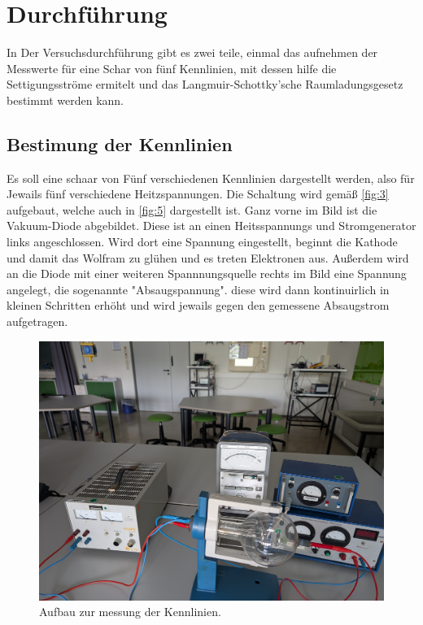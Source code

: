 \section{Durchführung}
\label{sec:Durchführung}
In Der Versuchsdurchführung gibt es zwei teile, einmal das aufnehmen der Messwerte für eine Schar von fünf Kennlinien, 
mit dessen hilfe die Settigungsströme ermitelt und das Langmuir-Schottky’sche Raumladungsgesetz bestimmt werden kann.
\subsection{Bestimung der Kennlinien}
\label{sec:1}
Es soll eine schaar von Fünf verschiedenen Kennlinien dargestellt werden, also für Jewails fünf verschiedene 
Heitzspannungen. Die Schaltung wird gemäß \autoref{fig:3} aufgebaut, welche auch in \autoref{fig:5} dargestellt ist.
Ganz vorne im Bild ist die Vakuum-Diode abgebildet. Diese ist an einen Heitsspannungs und Stromgenerator links angeschlossen.
Wird dort eine Spannung eingestellt, beginnt die Kathode und damit das Wolfram zu glühen und es treten Elektronen aus.
 Außerdem wird 
an die Diode mit einer weiteren Spannnungsquelle rechts im Bild eine Spannung angelegt, die sogenannte "Absaugspannung". diese wird 
dann kontinuirlich in kleinen Schritten erhöht und wird jewails gegen den gemessene Absaugstrom aufgetragen.
\begin{figure}[H]
    \centering
        \centering
        \includegraphics[width=\textwidth]{Bilder/2.jpg}
        \caption{Aufbau zur messung der Kennlinien.}
    \hfill
    \label{fig:4}
\end{figure}

